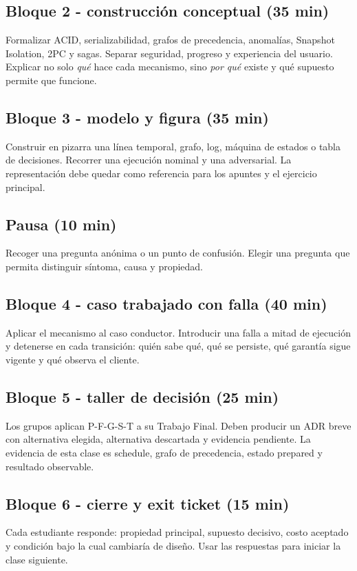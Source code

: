\documentclass[variant=docente,cover=institutional,mode=screen]{ua-engineering-v6-article}
\begin{document}
\subsection*{Bloque 2 - construcción conceptual (35 min)}
Formalizar ACID, serializabilidad, grafos de precedencia, anomalías, Snapshot Isolation, 2PC y sagas. Separar seguridad, progreso y experiencia del usuario. Explicar no solo \emph{qué} hace cada mecanismo, sino \emph{por qué} existe y qué supuesto permite que funcione.

\subsection*{Bloque 3 - modelo y figura (35 min)}
Construir en pizarra una línea temporal, grafo, log, máquina de estados o tabla de decisiones. Recorrer una ejecución nominal y una adversarial. La representación debe quedar como referencia para los apuntes y el ejercicio principal.

\subsection*{Pausa (10 min)}
Recoger una pregunta anónima o un punto de confusión. Elegir una pregunta que permita distinguir síntoma, causa y propiedad.

\subsection*{Bloque 4 - caso trabajado con falla (40 min)}
Aplicar el mecanismo al caso conductor. Introducir una falla a mitad de ejecución y detenerse en cada transición: quién sabe qué, qué se persiste, qué garantía sigue vigente y qué observa el cliente.

\subsection*{Bloque 5 - taller de decisión (25 min)}
Los grupos aplican P-F-G-S-T a su Trabajo Final. Deben producir un ADR breve con alternativa elegida, alternativa descartada y evidencia pendiente. La evidencia de esta clase es schedule, grafo de precedencia, estado prepared y resultado observable.

\subsection*{Bloque 6 - cierre y exit ticket (15 min)}
Cada estudiante responde: propiedad principal, supuesto decisivo, costo aceptado y condición bajo la cual cambiaría de diseño. Usar las respuestas para iniciar la clase siguiente.
\end{document}
